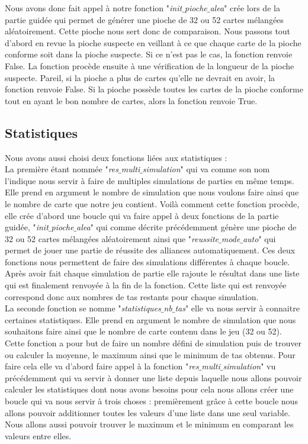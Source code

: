 \documentclass[10pt,a4paper,french,titlepage]{article}
\theoremstyle{definition}
\begin{document}
Nous avons donc fait appel à notre fonction "\textit{init$\_$pioche$\_$alea}" crée lors de la partie guidée qui permet de générer une pioche de 32 ou 52 cartes mélangées aléatoirement\label{piochealea}. Cette pioche nous sert donc de comparaison. Nous passons tout d'abord en revue la pioche suspecte en veillant à ce que chaque carte de la pioche conforme soit dans la pioche suspecte. Si ce n'est pas le cas, la fonction renvoie False. La fonction procède ensuite à une vérification de la longueur de la pioche suspecte. Pareil, si la pioche a plus de cartes qu'elle ne devrait en avoir, la fonction renvoie False. Si la pioche possède toutes les cartes de la pioche conforme tout en ayant le bon nombre de cartes, alors la fonction renvoie True.

\subsection{Statistiques}
Nous avons aussi choisi deux fonctions liées aux statistiques : \\
La première étant nommée "\textit{res$\_$multi$\_$simulation}" qui va comme son nom l'indique nous servir à faire de multiples simulations de parties en même temps. Elle prend en argument le nombre de simulation que nous voulons faire ainsi que le nombre de carte que notre jeu contient. Voilà comment cette fonction procède, elle crée d'abord une boucle qui va faire appel à deux fonctions de la partie guidée, "\textit{init$\_$pioche$\_$alea}" qui comme décrite précédemment génère une pioche de 32 ou 52 cartes mélangées aléatoirement ainsi que "\textit{reussite$\_$mode$\_$auto}" qui permet de jouer une partie de réussite des alliances automatiquement. Ces deux fonctions nous permettent de faire des simulations différentes à chaque boucle. Après avoir fait chaque simulation de partie elle rajoute le résultat dans une liste qui est finalement renvoyée à la fin de la fonction. Cette liste qui est renvoyée correspond donc aux nombres de tas restants pour chaque simulation.\\

La seconde fonction se nomme "\textit{statistiques$\_$nb$\_$tas}" elle va nous servir à connaitre certaines statistiques. Elle prend en argument le nombre de simulation que nous souhaitons faire ainsi que le nombre de carte contenu dans le jeu (32 ou 52). Cette fonction a pour but de faire un nombre défini de simulation puis de trouver ou calculer la moyenne, le maximum ainsi que le minimum de tas obtenus. Pour faire cela elle va d'abord faire appel à la fonction "\textit{res$\_$multi$\_$simulation}" vu précédemment qui va servir à donner une liste depuis laquelle nous allons pouvoir calculer les statistiques dont nous avons besoins pour cela nous allons créer une boucle qui va nous servir à trois choses : premièrement grâce à cette boucle nous allons pouvoir additionner toutes les valeurs d'une liste dans une seul variable. Nous allons aussi pouvoir trouver le maximum et le minimum en comparant les valeurs entre elles.
\end{document}
